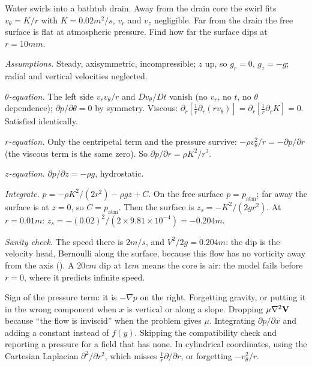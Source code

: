 \begin{example}
Water swirls into a bathtub drain. Away from the drain core the swirl fits $v_\theta = K/r$ with $K = 0.02\unit{m^2/s}$, $v_r$ and $v_z$ negligible. Far from the drain the free surface is flat at atmospheric pressure. Find how far the surface dips at $r = 10\unit{mm}$.

\emph{Assumptions.} Steady, axisymmetric, incompressible; $z$ up, so $g_r = 0$, $g_z = -g$; radial and vertical velocities neglected.

\emph{$\theta$-equation.} The left side $v_r v_\theta/r$ and $D v_\theta/Dt$ vanish (no $v_r$, no $t$, no $\theta$ dependence); $\partial p/\partial\theta = 0$ by symmetry. Viscous: $\partial_r[\frac1r\partial_r(r v_\theta)] = \partial_r[\frac1r\partial_r K] = 0$. Satisfied identically.

\emph{$r$-equation.} Only the centripetal term and the pressure survive: $-\rho v_\theta^2/r = -\partial p/\partial r$ (the viscous term is the same zero). So $\partial p/\partial r = \rho K^2/r^3$.

\emph{$z$-equation.} $\partial p/\partial z = -\rho g$, hydrostatic.

\emph{Integrate.} $p = -\rho K^2/(2r^2) - \rho g z + C$. On the free surface $p = p_{\text{atm}}$; far away the surface is at $z = 0$, so $C = p_{\text{atm}}$. Then the surface is $z_s = -K^2/(2gr^2)$. At $r = 0.01\unit{m}$: $z_s = -(0.02)^2/(2 \times 9.81 \times 10^{-4}) = -0.204\unit{m}$.

\emph{Sanity check.} The speed there is $2\unit{m/s}$, and $V^2/2g = 0.204\unit{m}$: the dip is the velocity head, Bernoulli along the surface, because this flow has no vorticity away from the axis (). A $20\unit{cm}$ dip at $1\unit{cm}$ means the core is air: the model fails before $r = 0$, where it predicts infinite speed.
\end{example}

\begin{trap}
Sign of the pressure term: it is $-\nabla p$ on the right. Forgetting gravity, or putting it in the wrong component when $x$ is vertical or along a slope. Dropping $\mu\nabla^2\mathbf{V}$ because ``the flow is inviscid'' when the problem gives $\mu$. Integrating $\partial p/\partial x$ and adding a constant instead of $f(y)$. Skipping the compatibility check and reporting a pressure for a field that has none. In cylindrical coordinates, using the Cartesian Laplacian $\partial^2/\partial r^2$, which misses $\frac1r\partial/\partial r$, or forgetting $-v_\theta^2/r$.
\end{trap}


